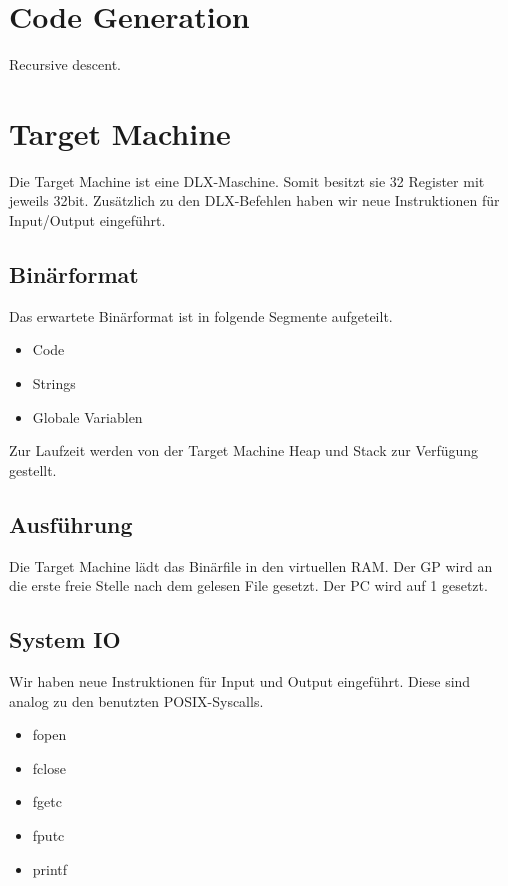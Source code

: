 \documentclass{article}
\begin{document}
	\section{Code Generation}
	Recursive descent.

	\section{Target Machine}
	Die Target Machine ist eine DLX-Maschine.
	Somit besitzt sie 32 Register mit jeweils 32bit.
	Zusätzlich zu den DLX-Befehlen haben wir neue Instruktionen für Input/Output eingeführt.

	\subsection{Binärformat}
	Das erwartete Binärformat ist in folgende Segmente aufgeteilt.
	\begin{itemize}
		\item Code
		\item Strings
		\item Globale Variablen
	\end{itemize}

	Zur Laufzeit werden von der Target Machine Heap und Stack zur Verfügung gestellt.

	\subsection{Ausführung}
	Die Target Machine lädt das Binärfile in den virtuellen RAM.
	Der GP wird an die erste freie Stelle nach dem gelesen File gesetzt.
	Der PC wird auf 1 gesetzt.

	\subsection{System IO}
	Wir haben neue Instruktionen für Input und Output eingeführt.
	Diese sind analog zu den benutzten POSIX-Syscalls.
	\begin{itemize}
		\item fopen
		\item fclose
		\item fgetc
		\item fputc
		\item printf
	\end{itemize}

	\newpage
\end{document}
